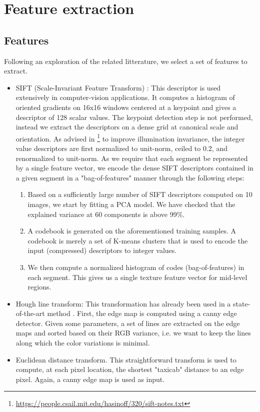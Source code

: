\documentclass[10pt,conference,compsocconf]{IEEEtran}
\begin{document}
	\section{Feature extraction}
	\subsection{Features}
	\label{features}
	Following an exploration of the related litterature, we select a set of features to extract.
	\begin{itemize}
		\item SIFT (Scale-Invariant Feature Transform) \cite{lowe99}: This descriptor is used extensively in computer-vision applications. It computes a histogram of oriented gradients on 16x16 windows centered at a keypoint and gives a descriptor of 128 scalar values. The keypoint detection step is not performed, instead we extract the descriptors on a dense grid at canonical scale and orientation. As advised in \footnote{\url{https://people.csail.mit.edu/hasinoff/320/sift-notes.txt}} to improve illumination invariance, the integer value descriptors are first normalized to unit-norm, ceiled to 0.2, and renormalized to unit-norm. As we require that each segment be represented by a single feature vector, we encode the dense SIFT descriptors contained in a given segment in a "bag-of-features" manner through the following steps: 
		\begin{enumerate}
			\item Based on a sufficiently large number of SIFT descriptors computed on 10 images, we start by fitting a PCA model. We have checked that the explained variance at 60 components is above 99\%.
			\item A codebook is generated on the aforementioned training samples. A codebook is merely a set of K-means clusters that is used to encode the input (compressed) descriptors to integer values.
			\item We then compute a normalized histogram of codes (bag-of-features) in each segment. This gives us a single texture feature vector for mid-level regions.
		\end{enumerate}
		\item Hough line transform: This transformation has already been used in a state-of-the-art method \cite{2016ISPAr41B3..891L}. First, the edge map is computed using a canny edge detector. Given some parameters, a set of lines are extracted on the edge maps and sorted based on their RGB variance, i.e. we want to keep the lines along which the color variations is minimal.
		\item Euclidean distance transform. This straightforward transform is used to compute, at each pixel location, the shortest "taxicab" distance to an edge pixel. Again, a canny edge map is used as input.
	\end{itemize}
\end{document}
